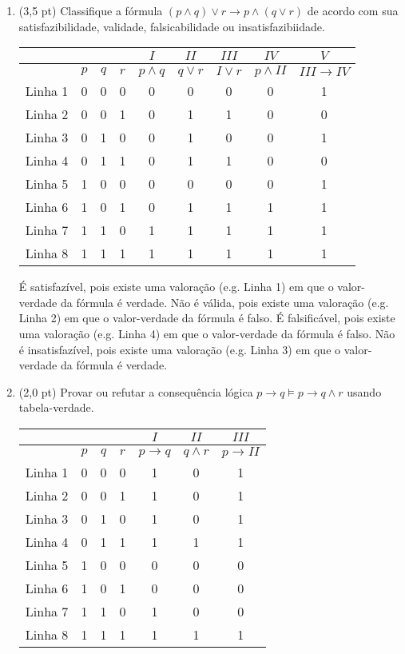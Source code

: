 \documentclass[11pt,a4paper,oneside]{article}
\begin{document}
\begin{enumerate}
	\item (3,5 pt) Classifique a fórmula $(p \wedge q) \vee r \rightarrow p \wedge (q \vee r)$ de acordo com sua satisfazibilidade, validade, falsicabilidade ou insatisfazibiidade.	\\
		{\color{verde}
			\begin{center}
				\begin{tabular}{c|ccc|c|c|c|c|c}
				& &  &  & $I$ & $II$ & $III$ & $IV$ & $V$ \\ 
				\hline 
				& $p$ & $q$ & $r$ & $p \wedge q$ & $q \vee r$ & $I \vee r$ & $p \wedge II$ & $III \rightarrow IV$\\ 
				\hline 
				Linha 1 & 0 & 0 & 0 & 0 & 0 & 0 & 0 & 1 \\ 
				Linha 2 & 0 & 0 & 1 & 0 & 1 & 1 & 0 & 0 \\ 
				Linha 3 & 0 & 1 & 0 & 0 & 1 & 0 & 0 & 1 \\ 
				Linha 4 & 0 & 1 & 1 & 0 & 1 & 1 & 0 & 0 \\ 
				Linha 5 & 1 & 0 & 0 & 0 & 0 & 0 & 0 & 1 \\ 
				Linha 6 & 1 & 0 & 1 & 0 & 1 & 1 & 1 & 1 \\ 
				Linha 7 & 1 & 1 & 0 & 1 & 1 & 1 & 1 & 1 \\ 
				Linha 8 & 1 & 1 & 1 & 1 & 1 & 1 & 1 & 1 \\ 
				\hline 
				\end{tabular}  
			\end{center} 
			
			É satisfazível, pois existe uma valoração (e.g. Linha 1) em que o valor-verdade da fórmula é verdade. Não é válida, pois existe uma valoração (e.g. Linha 2) em que o valor-verdade da fórmula é falso. É falsificável, pois existe uma valoração (e.g. Linha 4) em que o valor-verdade da fórmula é falso. Não é insatisfazível, pois existe uma valoração (e.g. Linha 3) em que o valor-verdade da fórmula é verdade.  
		}
	\item (2,0 pt) Provar ou refutar a consequência lógica $p \rightarrow q \models p \rightarrow q \wedge r$ usando tabela-verdade.\\
		{\color{verde}
			\begin{center}
				\begin{tabular}{c|ccc|c|c|c}
				& &  &  & $I$ & $II$ & $III$ \\ 
				\hline 
				& $p$ & $q$ & $r$ & $p \rightarrow q$ & $q \wedge r$ & $p \rightarrow II$ \\ 
				\hline 
				Linha 1 & 0 & 0 & 0 & 1 & 0 & 1 \\ 
				Linha 2 & 0 & 0 & 1 & 1 & 0 & 1 \\ 
				Linha 3 & 0 & 1 & 0 & 1 & 0 & 1 \\ 
				Linha 4 & 0 & 1 & 1 & 1 & 1 & 1 \\ 
				Linha 5 & 1 & 0 & 0 & 0 & 0 & 0 \\ 
				Linha 6 & 1 & 0 & 1 & 0 & 0 & 0 \\ 
				Linha 7 & 1 & 1 & 0 & 1 & 0 & 0 \\ 
				Linha 8 & 1 & 1 & 1 & 1 & 1 & 1 \\ 
				\hline 
				\end{tabular}  
			\end{center} 
			
}
\end{enumerate}
\end{document}
